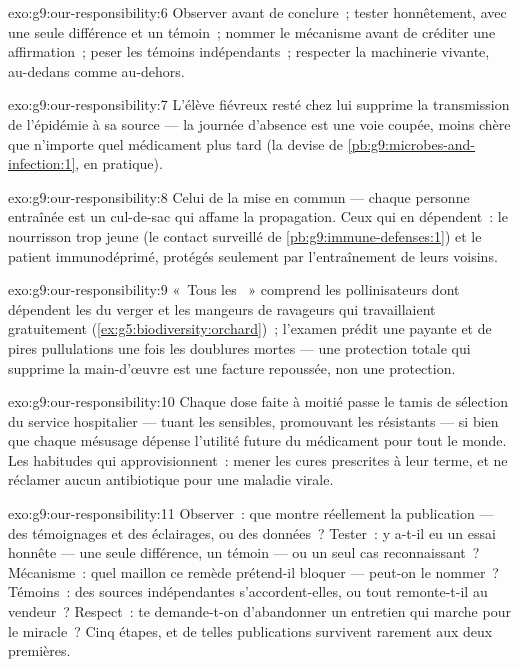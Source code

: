 \begin{solution}{exo:g9:our-responsibility:6}
Observer avant de conclure~; tester honnêtement, avec une
seule différence et un témoin~; nommer le mécanisme avant de
créditer une affirmation~; peser les témoins indépendants~;
respecter la machinerie vivante, au-dedans comme au-dehors.
\end{solution}

\begin{solution}{exo:g9:our-responsibility:7}
L'élève fiévreux resté chez lui supprime la transmission de
l'épidémie à sa source --- la journée d'absence est une
voie coupée, moins chère que n'importe quel médicament plus
tard (la devise de \cref{pb:g9:microbes-and-infection:1},
en pratique).
\end{solution}

\begin{solution}{exo:g9:our-responsibility:8}
Celui de la mise en commun --- chaque personne entraînée est
un cul-de-sac qui affame la propagation. Ceux qui en
dépendent~: le nourrisson trop jeune (le contact surveillé
de \cref{pb:g9:immune-defenses:1}) et le patient
immunodéprimé, protégés seulement par l'entraînement de
leurs voisins.
\end{solution}

\begin{solution}{exo:g9:our-responsibility:9}
«~Tous les ~» comprend les pollinisateurs dont
dépendent les  du verger et les mangeurs de ravageurs
qui travaillaient gratuitement
(\cref{ex:g5:biodiversity:orchard})~; l'examen prédit une
 payante et de pires pullulations une fois les
doublures mortes --- une protection totale qui supprime la
main-d'œuvre est une facture repoussée, non une protection.
\end{solution}

\begin{solution}{exo:g9:our-responsibility:10}
Chaque dose faite à moitié passe le tamis de sélection du
service hospitalier --- tuant les sensibles, promouvant les
résistants --- si bien que chaque mésusage dépense l'utilité
future du médicament pour tout le monde. Les habitudes qui
approvisionnent~: mener les cures prescrites à leur terme,
et ne réclamer aucun antibiotique pour une maladie virale.
\end{solution}

\begin{solution}{exo:g9:our-responsibility:11}
Observer~: que montre réellement la publication --- des
témoignages et des éclairages, ou des données~? Tester~:
y a-t-il eu un essai honnête --- une seule différence, un
témoin --- ou un seul cas reconnaissant~? Mécanisme~: quel
maillon ce remède prétend-il bloquer --- peut-on le nommer~?
Témoins~: des sources indépendantes s'accordent-elles, ou
tout remonte-t-il au vendeur~? Respect~: te demande-t-on
d'abandonner un entretien qui marche pour le miracle~? Cinq
étapes, et de telles publications survivent rarement aux
deux premières.
\end{solution}

